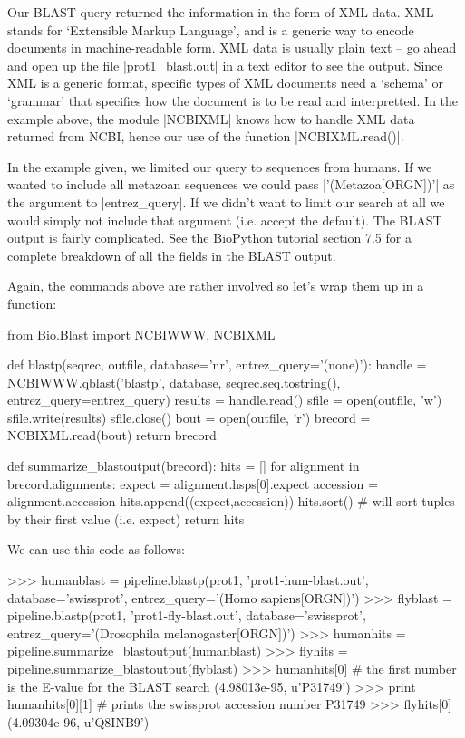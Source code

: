 Our BLAST query returned the information in the form of XML data.  XML stands for `Extensible Markup Language', and is a generic way to encode documents in machine-readable form.  XML data is usually plain text -- go ahead and open up the file |prot1_blast.out| in a text editor to see the output. Since XML is a generic format, specific types of XML documents need a `schema' or `grammar' that specifies how the document is to be read and interpretted. In the example above, the module |NCBIXML| knows how to handle XML data returned from NCBI, hence our use of the function |NCBIXML.read()|.

In the example given, we limited our query to sequences from humans. If we wanted to include all metazoan sequences we could pass |'(Metazoa[ORGN])'| as the argument to |entrez_query|. If we didn't want to limit our search at all we would simply not include that argument (i.e. accept the default). The BLAST output is fairly complicated. See the BioPython tutorial section 7.5 for a complete breakdown of all the fields in the BLAST output.

Again, the commands above are rather involved so let's wrap them up in a function:

\begin{python}
from Bio.Blast import NCBIWWW, NCBIXML

def blastp(seqrec, outfile, database='nr', entrez_query='(none)'):
    handle = NCBIWWW.qblast('blastp', database, seqrec.seq.tostring(),
    				entrez_query=entrez_query)
    results = handle.read()
    sfile = open(outfile, 'w')
    sfile.write(results)
    sfile.close()
    bout = open(outfile, 'r')
    brecord = NCBIXML.read(bout)
    return brecord

def summarize_blastoutput(brecord):
    hits = []
    for alignment in brecord.alignments:
        expect = alignment.hsps[0].expect
        accession = alignment.accession
        hits.append((expect,accession))
    hits.sort() # will sort tuples by their first value (i.e. expect)
    return hits
\end{python}

We can use this code as follows:
\begin{python}
>>> humanblast = pipeline.blastp(prot1, 'prot1-hum-blast.out', database='swissprot', entrez_query='(Homo sapiens[ORGN])')
>>> flyblast = pipeline.blastp(prot1, 'prot1-fly-blast.out', database='swissprot', entrez_query='(Drosophila melanogaster[ORGN])')
>>> humanhits = pipeline.summarize_blastoutput(humanblast)
>>> flyhits = pipeline.summarize_blastoutput(flyblast)
>>> humanhits[0] # the first number is the E-value for the BLAST search
(4.98013e-95, u'P31749')
>>> print humanhits[0][1]  # prints the swissprot accession number
P31749
>>> flyhits[0]
(4.09304e-96, u'Q8INB9')
\end{python}

